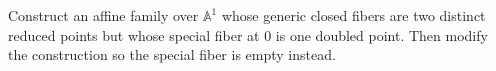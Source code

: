 \begin{problem}\label{chall:vi25-05}
Construct an affine family over $\mathbb A^1$ whose generic closed fibers are two distinct reduced points but whose special fiber at $0$ is one doubled point. Then modify the construction so the special fiber is empty instead.
\end{problem}
